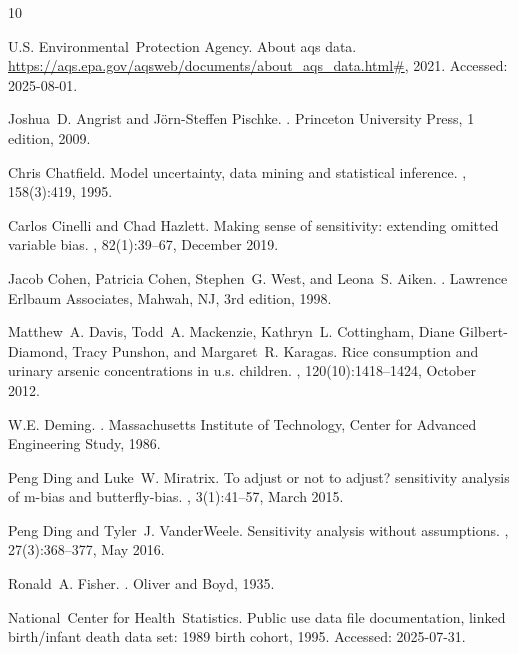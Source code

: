 \documentclass[11pt]{amsart}
\begin{document}
%

\begin{thebibliography}{10}

U.S. Environmental~Protection Agency.
\newblock About aqs data.
\newblock \url{https://aqs.epa.gov/aqsweb/documents/about_aqs_data.html#}, 2021.
\newblock Accessed: 2025-08-01.

Joshua~D. Angrist and J\"orn-Steffen Pischke.
.
\newblock Princeton University Press, 1 edition, 2009.

Chris Chatfield.
\newblock Model uncertainty, data mining and statistical inference.
, 158(3):419, 1995.

Carlos Cinelli and Chad Hazlett.
\newblock Making sense of sensitivity: extending omitted variable bias.
, 82(1):39--67, December 2019.

Jacob Cohen, Patricia Cohen, Stephen~G. West, and Leona~S. Aiken.
.
\newblock Lawrence Erlbaum Associates, Mahwah, NJ, 3rd edition, 1998.

Matthew~A. Davis, Todd~A. Mackenzie, Kathryn~L. Cottingham, Diane Gilbert-Diamond, Tracy Punshon, and Margaret~R. Karagas.
\newblock Rice consumption and urinary arsenic concentrations in u.s. children.
, 120(10):1418–1424, October 2012.

W.E. Deming.
.
\newblock Massachusetts Institute of Technology, Center for Advanced Engineering Study, 1986.

Peng Ding and Luke~W. Miratrix.
\newblock To adjust or not to adjust? sensitivity analysis of m-bias and butterfly-bias.
, 3(1):41--57, March 2015.

Peng Ding and Tyler~J. VanderWeele.
\newblock Sensitivity analysis without assumptions.
, 27(3):368--377, May 2016.

Ronald~A. Fisher.
.
\newblock Oliver and Boyd, 1935.

National~Center for Health~Statistics.
\newblock Public use data file documentation, linked birth/infant death data set: 1989 birth cohort, 1995.
\newblock Accessed: 2025-07-31.


\end{thebibliography}
\end{document}
